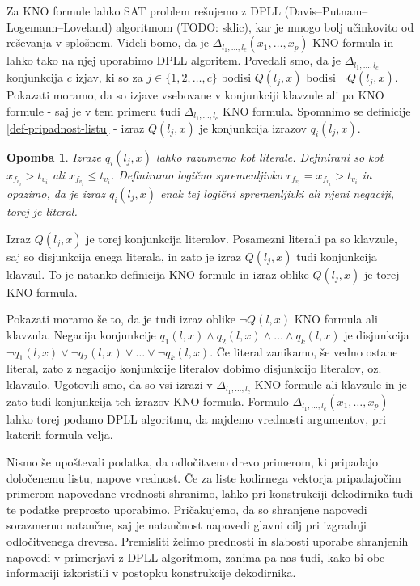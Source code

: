 \documentclass[12pt,a4paper]{article}
\newtheorem{opomba}{Opomba}
\begin{document}
Za KNO formule lahko SAT problem rešujemo z DPLL (Davis--\-Putnam--\-Logemann--\-Loveland) algoritmom (TODO: sklic), kar je mnogo bolj učinkovito od reševanja v splošnem. %
Videli bomo, da je $\Delta_{l_1,\ldots,l_c}(x_1,\ldots,x_p)$ KNO formula in lahko tako na njej uporabimo DPLL algoritem.
Povedali smo, da je $\Delta_{l_1,\ldots,l_c}$ konjunkcija $c$ izjav, ki so za $j \in \{1,2,\ldots,c\}$ bodisi $Q(l_j,x)$ bodisi $\lnot Q(l_j,x)$.
Pokazati moramo, da so izjave vsebovane v konjunkciji klavzule ali pa KNO formule - saj je v tem primeru tudi $\Delta_{l_1,\ldots,l_c}$ KNO formula.
Spomnimo se definicije \ref{def-pripadnost-listu} - izraz $Q(l_j,x)$ je konjunkcija izrazov $q_i(l_j,x)$.
%
\begin{opomba}
	Izraze $q_i(l_j,x)$ lahko razumemo kot literale.
	Definirani so kot $x_{f_{v_i}} > t_{v_i}$ ali $x_{f_{v_i}} \leq t_{v_i}$.
	Definiramo logično spremenljivko $r_{f_{v_i}} = x_{f_{v_i}} > t_{v_i}$ in opazimo, 
	da je izraz $q_i(l_j,x)$ enak tej logični spremenljivki ali njeni negaciji, torej je literal.
\end{opomba}
% 
Izraz $Q(l_j,x)$ je torej konjunkcija literalov.
Posamezni literali pa so klavzule, saj so disjunkcija enega literala, in zato je izraz $Q(l_j,x)$ tudi konjunkcija klavzul.
To je natanko definicija KNO formule in izraz oblike $Q(l_j,x)$ je torej KNO formula.

Pokazati moramo še to, da je tudi izraz oblike $\lnot Q(l,x)$ KNO formula ali klavzula.
Negacija konjunkcije $q_1(l,x) \land q_2(l,x) \land \ldots \land q_k(l,x)$ je disjunkcija $\lnot q_1(l,x) \lor \lnot q_2(l,x) \lor \ldots \lor \lnot q_k(l,x)$.
Če literal zanikamo, še vedno ostane literal, zato z negacijo konjunkcije literalov dobimo disjunkcijo literalov, oz. klavzulo.
Ugotovili smo, da so vsi izrazi v $\Delta_{l_1,\ldots,l_c}$ KNO formule ali klavzule in je zato tudi konjunkcija teh izrazov KNO formula.
Formulo $\Delta_{l_1,\ldots,l_c}(x_1,\ldots,x_p)$ lahko torej podamo DPLL algoritmu, da najdemo vrednosti argumentov, pri katerih formula velja.

Nismo še upoštevali podatka, da odločitveno drevo primerom, ki pripadajo določenemu listu, napove vrednost.
Če za liste kodirnega vektorja pripadajočim primerom napovedane vrednosti shranimo, lahko pri konstrukciji dekodirnika tudi te podatke preprosto uporabimo.
Pričakujemo, da so shranjene napovedi sorazmerno natančne, saj je natančnost napovedi glavni cilj pri izgradnji odločitvenega drevesa.
Premisliti želimo prednosti in slabosti uporabe shranjenih napovedi v primerjavi z DPLL algoritmom, zanima pa nas tudi, kako bi obe informaciji izkoristili v postopku konstrukcije dekodirnika.
\end{document}
